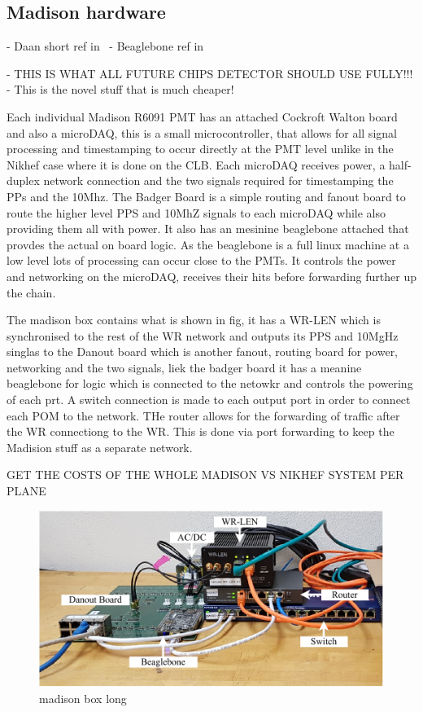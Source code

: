 \subsection{Madison hardware} %
\label{sec:daq_hard_madison} %

- Daan short ref in~\cite{eijk2018}
- Beaglebone ref in~\cite{beagle2020}

- THIS IS WHAT ALL FUTURE CHIPS DETECTOR SHOULD USE FULLY!!!
- This is the novel stuff that is much cheaper!

Each individual Madison R6091 PMT has an attached Cockroft Walton board and also a microDAQ, this
is a small microcontroller, that allows for all signal processing and timestamping to occur
directly at the PMT level unlike in the Nikhef case where it is done on the CLB. Each microDAQ
receives power, a half-duplex network connection and the two signals required for timestamping the
PPs and the 10Mhz. The Badger Board is a simple routing and fanout board to route the higher level
PPS and 10MhZ signals to each microDAQ while also providing them all with power. It also has an
mesinine beaglebone attached that provdes the actual on board logic. As the beaglebone is a full
linux machine at a low level lots of processing can occur close to the PMTs. It controls the power
and networking on the microDAQ, receives their hits before forwarding further up the chain.

The madison box contains what is shown in fig, it has a WR-LEN which is synchronised to the rest
of the WR network and outputs its PPS and 10MgHz singlas to the Danout board which is another
fanout, routing board for power, networking and the two signals, liek the badger board it has a
meanine beaglebone for logic which is connected to the netowkr and controls the powering of each
prt. A switch connection is made to each output port in order to connect each POM to the network.
THe router allows for the forwarding of traffic after the WR connectiong to the WR. This is done
via port forwarding to keep the Madision stuff as  a separate network.

GET THE COSTS OF THE WHOLE MADISON VS NIKHEF SYSTEM PER PLANE

\begin{figure} %
    \includegraphics[width=\textwidth]{diagrams/5-daq/madison_box.pdf}
    \caption[madison box short]
    {madison box long}
    \label{fig:madison_box}
\end{figure}


